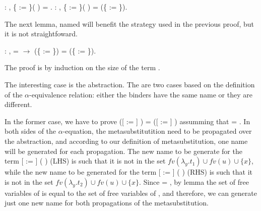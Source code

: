 \begin{coqdoccode}
\coqdocemptyline
\coqdocnoindent
{} : \coqdockw{\ensuremath{\forall}}   , \{ := \}(  ) =   .\coqdoceol
\coqdocemptyline
\coqdocnoindent
{} : \coqdockw{\ensuremath{\forall}}    , \{ := \}(   ) =    (\{ := \}).\coqdoceol
\coqdocemptyline
\coqdocemptyline
\end{coqdoccode}
The next lemma, named  will benefit the strategy used in the previous proof, but it is not straightfoward.
\begin{coqdoccode}
\coqdocemptyline
\coqdocnoindent
{} : \coqdockw{\ensuremath{\forall}}    ,  =  \ensuremath{\rightarrow} (\{ := \}) = (\{ := \}).\coqdoceol
\end{coqdoccode}
 The proof is by induction on the size of the term . 
\begin{coqdoccode}
\end{coqdoccode}
The interesting case is the abstraction. The are two cases based on the definition of the $\alpha$-equivalence relation: either the binders have the same name or they are different. 
\begin{coqdoccode}
\end{coqdoccode}
In the former case, we have to prove  ([ := ]   ) = ([ := ]   ) assumming that  = . In both sides of the $\alpha$-equation, the metasubstitutition need to be propagated over the abstraction, and according to our definition of metasubstitution, one name will be generated for each propagation. The new name to be generate for the term [ := ] (  ) (LHS) is such that it is not in the set $fv(\lambda_y.t_1)\cup fv(u) \cup \{x\}$, while the new name to be generated for the term [ := ] (  ) (RHS) is such that it is not in the set $fv(\lambda_y.t_2)\cup fv(u) \cup \{x\}$. Since  = , by lemma  the set of free variables of  is equal to the set of free variables of , and therefore, we can generate just one new name for both propagations of the metasubstitution. 
